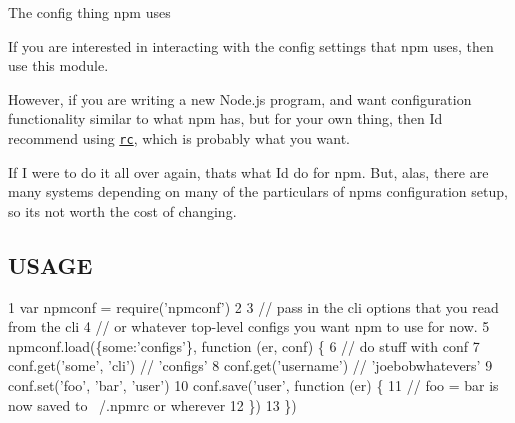 The config thing npm uses

If you are interested in interacting with the config settings that npm uses, then use this module.

However, if you are writing a new Node.\+js program, and want configuration functionality similar to what npm has, but for your own thing, then I\textquotesingle{}d recommend using \href{https://github.com/dominictarr/rc}{\tt rc}, which is probably what you want.

If I were to do it all over again, that\textquotesingle{}s what I\textquotesingle{}d do for npm. But, alas, there are many systems depending on many of the particulars of npm\textquotesingle{}s configuration setup, so it\textquotesingle{}s not worth the cost of changing.

\subsection*{U\+S\+A\+G\+E}


\begin{DoxyCode}
1 var npmconf = require('npmconf')
2 
3 // pass in the cli options that you read from the cli
4 // or whatever top-level configs you want npm to use for now.
5 npmconf.load(\{some:'configs'\}, function (er, conf) \{
6   // do stuff with conf
7   conf.get('some', 'cli') // 'configs'
8   conf.get('username') // 'joebobwhatevers'
9   conf.set('foo', 'bar', 'user')
10   conf.save('user', function (er) \{
11     // foo = bar is now saved to ~/.npmrc or wherever
12   \})
13 \})
\end{DoxyCode}
 
